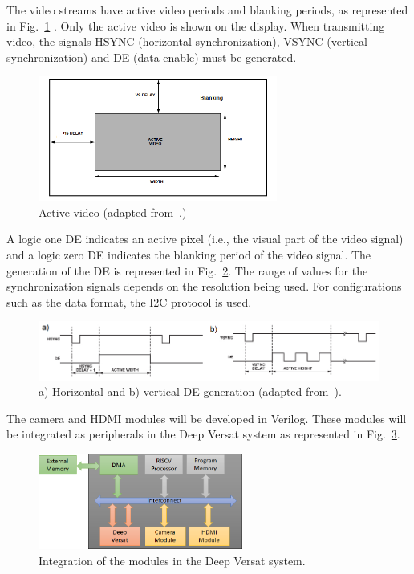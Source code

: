 The video streams have active video periods and blanking periods, as represented in Fig.~\ref{fig:active_video} . Only the active video is shown on the display. When transmitting video, the signals HSYNC (horizontal synchronization), VSYNC (vertical synchronization) and DE (data enable) must be generated.

\begin{figure}[!htb]
  \centering
  \includegraphics[width=0.7\textwidth]{Figures/active_video.png}
  \caption{Active video (adapted from~\cite{camera}.)}
  \label{fig:active_video}
\end{figure}

A logic one DE indicates an active pixel (i.e., the visual part of the video signal) and a logic zero DE indicates the blanking period of the video signal. The generation of the DE is represented in Fig.~\ref{fig:hdmi_signals}. The range of values for the synchronization signals depends on the resolution being used. For configurations such as the data format, the I2C protocol is used.

\begin{figure}[!htb]
  \centering
  \includegraphics[width=\textwidth]{Figures/hdmi_signals.png}
  \caption{a) Horizontal and b) vertical DE generation (adapted from~\cite{camera}).}
  \label{fig:hdmi_signals}
\end{figure}

The camera and HDMI modules will be developed in Verilog. These modules will be integrated as peripherals in the Deep Versat system as represented in Fig.~\ref{fig:final_system}. 

\begin{figure}[!htb]
  \centering
  \includegraphics[width=0.6\textwidth]{Figures/final_system.png}
  \caption{Integration of the modules in the Deep Versat system.}
  \label{fig:final_system}
\end{figure}

